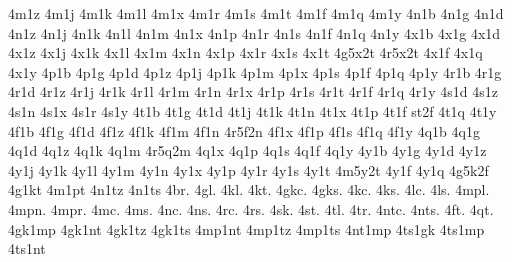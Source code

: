 {4m1z
4m1j
4m1k
4m1l
4m1x
4m1r
4m1s
4m1t
4m1f
4m1q
4m1y
4n1b
4n1g
4n1d
4n1z
4n1j
4n1k
4n1l
4n1m
4n1x
4n1p
4n1r
4n1s
4n1f
4n1q
4n1y
4x1b
4x1g
4x1d
4x1z
4x1j
4x1k
4x1l
4x1m
4x1n
4x1p
4x1r
4x1s
4x1t
4g5x2t %
4r5x2t %
4x1f
4x1q
4x1y
4p1b
4p1g
4p1d
4p1z
4p1j
4p1k
4p1m
4p1x
4p1s
4p1f
4p1q
4p1y
4r1b
4r1g
4r1d
4r1z
4r1j
4r1k
4r1l
4r1m
4r1n
4r1x
4r1p
4r1s
4r1t
4r1f
4r1q
4r1y
4s1d %
4s1z
4s1n %
4s1x
4s1r
4s1y
4t1b
4t1g
4t1d
4t1j
4t1k
4t1n
4t1x
4t1p
4t1f
st2f %
4t1q
4t1y
4f1b
4f1g
4f1d
4f1z
4f1k %
4f1m
4f1n
4r5f2n %
4f1x
4f1p
4f1s
4f1q
4f1y
4q1b
4q1g
4q1d
4q1z
4q1k
4q1m
4r5q2m %
4q1x
4q1p
4q1s
4q1f
4q1y
4y1b
4y1g
4y1d
4y1z
4y1j
4y1k
4y1l
4y1m
4y1n
4y1x
4y1p
4y1r
4y1s
4y1t
4m5y2t %
4y1f
4y1q
4g5k2f %
4g1kt  %
4m1pt  %
4n1tz  %
4n1ts  %
4br.  %
4gl.  %
4kl.  %
4kt.  %
4gkc. %
4gks.
4kc.  %
4ks.
4lc.  %
4ls.
4mpl. %
4mpn. %
4mpr. %
4mc.  %
4ms.
4nc.  %
4ns.
4rc.  %
4rs.
4sk.  %
4st.  %
4tl.  %
4tr.  %
4ntc. %
4nts.
4ft.  %
4qt.  %
4gk1mp
4gk1nt
4gk1tz
4gk1ts
4mp1nt
4mp1tz
4mp1ts
4nt1mp
4ts1gk
4ts1mp
4ts1nt
} %
\endgroup
\endinput
